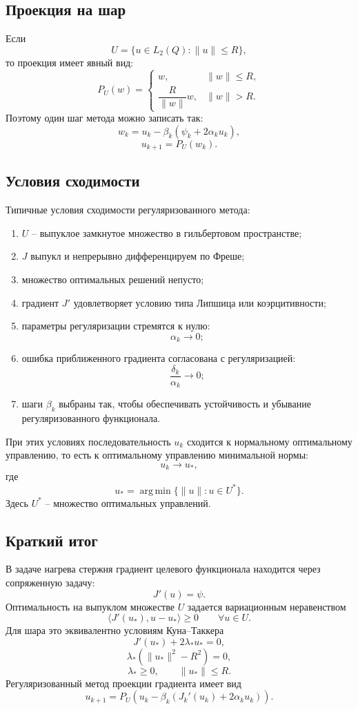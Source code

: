 \documentclass[12pt,a4paper]{article}
\begin{document}
\subsection*{Проекция на шар}
Если
\[
U=\{u\in L_2(Q):\|u\|\le R\},
\]
то проекция имеет явный вид:
\[
P_U(w)=
\begin{cases}
w, & \|w\|\le R,\\[2mm]
\dfrac{R}{\|w\|}w, & \|w\|>R.
\end{cases}
\]
Поэтому один шаг метода можно записать так:
\[
w_k=u_k-\beta_k(\psi_k+2\alpha_k u_k),
\]
\[
u_{k+1}=P_U(w_k).
\]

\subsection*{Условия сходимости}
Типичные условия сходимости регуляризованного метода:
\begin{enumerate}[leftmargin=2em]
\item \(U\) -- выпуклое замкнутое множество в гильбертовом пространстве;
\item \(J\) выпукл и непрерывно дифференцируем по Фреше;
\item множество оптимальных решений непусто;
\item градиент \(J'\) удовлетворяет условию типа Липшица или коэрцитивности;
\item параметры регуляризации стремятся к нулю:
\[
\alpha_k\to0;
\]
\item ошибка приближенного градиента согласована с регуляризацией:
\[
\frac{\delta_k}{\alpha_k}\to0;
\]
\item шаги \(\beta_k\) выбраны так, чтобы обеспечивать устойчивость и убывание регуляризованного функционала.
\end{enumerate}
При этих условиях последовательность \(u_k\) сходится к нормальному оптимальному управлению, то есть к оптимальному управлению минимальной нормы:
\[
u_k\to u_*,
\]
где
\[
u_*=
\operatorname*{arg\,min}\{\|u\|:u\in U^*\}.
\]
Здесь \(U^*\) -- множество оптимальных управлений.

\subsection*{Краткий итог}
В задаче нагрева стержня градиент целевого функционала находится через сопряженную задачу:
\[
J'(u)=\psi.
\]
Оптимальность на выпуклом множестве \(U\) задается вариационным неравенством
\[
\langle J'(u_*),u-u_*\rangle\ge0
\qquad \forall u\in U.
\]
Для шара это эквивалентно условиям Куна--Таккера
\[
J'(u_*)+2\lambda_*u_*=0,
\]
\[
\lambda_*(\|u_*\|^2-R^2)=0,
\]
\[
\lambda_*\ge0,
\qquad
\|u_*\|\le R.
\]
Регуляризованный метод проекции градиента имеет вид
\[
u_{k+1}=P_U\left(u_k-\beta_k(J_k'(u_k)+2\alpha_k u_k)\right).
\]
\end{document}
